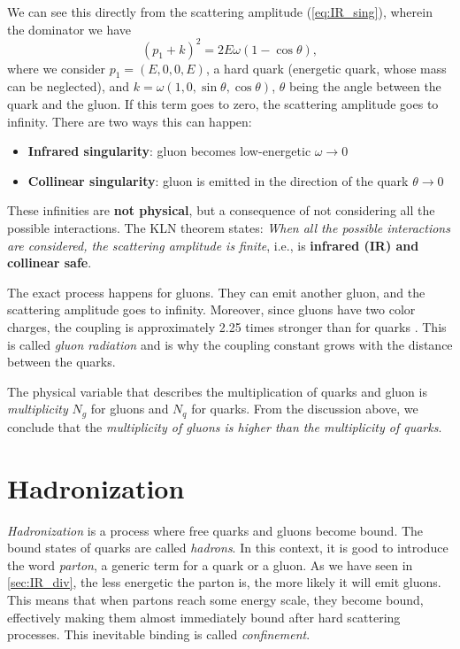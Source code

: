 We can see this directly from the scattering amplitude (\ref{eq:IR_sing}), wherein the dominator we have
\begin{equation}
    \label{eq:IR_sing}
    (p_1+k)^2 = 2E\omega(1- \cos{\theta}),
\end{equation}
where we consider $p_1 = (E,0,0,E)$, a hard quark (energetic quark, whose mass can be neglected), and $k = \omega (1, 0, \sin{\theta}, \cos{\theta})$, $\theta$ being the angle between the quark and the gluon.
If this term goes to zero, the scattering amplitude goes to infinity.
There are two ways this can happen: 
\begin{itemize}
    \item \textbf{Infrared singularity}: gluon becomes low-energetic $\omega \rightarrow 0$
    \item \textbf{Collinear singularity}: gluon is emitted in the direction of the quark $\theta \rightarrow 0$
\end{itemize}
These infinities are \textbf{not physical}, but a consequence of not considering all the possible interactions.
The KLN theorem \cite{IR_sing_K,IR_sing_LN} states: \emph{When all the possible interactions are considered, the scattering amplitude is finite}, i.e., is \textbf{infrared (IR) and collinear safe}. 

The exact process happens for gluons. 
They can emit another gluon, and the scattering amplitude goes to infinity.
Moreover, since gluons have two color charges, the coupling is approximately 2.25 times stronger than for quarks \cite{qcd_salam}.
This is called \emph{gluon radiation} and is why the coupling constant grows with the distance between the quarks.

The physical variable that describes the multiplication of quarks and gluon is \emph{multiplicity} $N_g$ for gluons and $N_q$ for quarks.
From the discussion above, we conclude that the \emph{multiplicity of gluons is higher than the multiplicity of quarks}.

\section{Hadronization}
\label{sec:hadronization}
\emph{Hadronization} is a process where free quarks and gluons become bound.
The bound states of quarks are called \emph{hadrons}.
In this context, it is good to introduce the word \emph{parton}, a generic term for a quark or a gluon.
As we have seen in \cref{sec:IR_div}, the less energetic the parton is, the more likely it will emit gluons.
This means that when partons reach some energy scale, they become bound, effectively making them almost immediately bound after hard scattering processes.
This inevitable binding is called \emph{confinement}.

